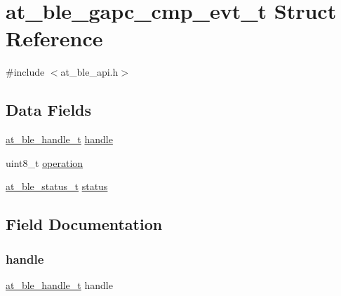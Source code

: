 \hypertarget{structat__ble__gapc__cmp__evt__t}{}\section{at\+\_\+ble\+\_\+gapc\+\_\+cmp\+\_\+evt\+\_\+t Struct Reference}
\label{structat__ble__gapc__cmp__evt__t}


{\ttfamily \#include $<$at\+\_\+ble\+\_\+api.\+h$>$}

\subsection*{Data Fields}
\begin{DoxyCompactItemize}
\item 
\mbox{\hyperlink{at__ble__api_8h_abd23646d0c662860741f787efc8456f2}{at\+\_\+ble\+\_\+handle\+\_\+t}} \mbox{\hyperlink{structat__ble__gapc__cmp__evt__t_ab8b0f353cb6a8d85f0822900e3b7cf35}{handle}}
\item 
uint8\+\_\+t \mbox{\hyperlink{structat__ble__gapc__cmp__evt__t_a97d486d6926f9137837e1d8ecf0bbfdd}{operation}}
\item 
\mbox{\hyperlink{group__error__codes__group_ga3b1db9b95feb157b3c188ca27fe76988}{at\+\_\+ble\+\_\+status\+\_\+t}} \mbox{\hyperlink{structat__ble__gapc__cmp__evt__t_a0b48093fc2030779fc47e5216f8019e2}{status}}
\end{DoxyCompactItemize}


\subsection{Field Documentation}
\mbox{\label{structat__ble__gapc__cmp__evt__t_ab8b0f353cb6a8d85f0822900e3b7cf35}} 
\subsubsection{\texorpdfstring{handle}{handle}}
{\footnotesize\ttfamily \mbox{\hyperlink{at__ble__api_8h_abd23646d0c662860741f787efc8456f2}{at\+\_\+ble\+\_\+handle\+\_\+t}} handle}

\mbox{\label{structat__ble__gapc__cmp__evt__t_a97d486d6926f9137837e1d8ecf0bbfdd}} 
